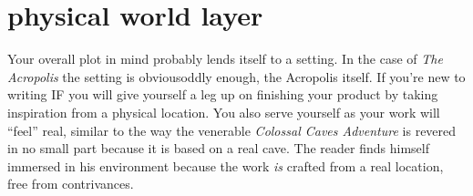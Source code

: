 \section{physical world layer}
Your overall plot in mind probably lends itself to a setting. In the case of
\textit{The Acropolis} the setting is obvious\textemdash oddly enough, the
Acropolis itself. If you're new to writing IF you will give yourself a leg up on
finishing your product by taking inspiration from a physical location.
You also serve yourself as your work will ``feel'' real, similar to the way the venerable \textit{Colossal Caves Adventure} is revered in no small part because it is based on a real cave. The reader finds himself immersed in
his environment because the work \textit{is} crafted from a real location, free from contrivances.

